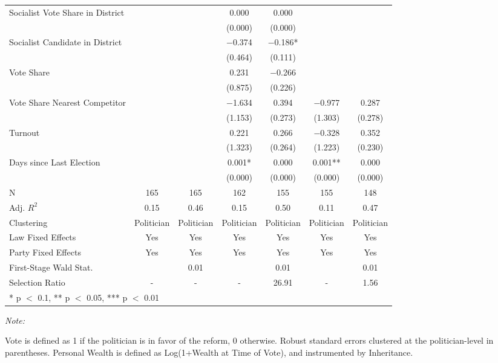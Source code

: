 \begin{table}[!h]
{\begin{threeparttable}
\begin{tabular}[t]{lcccccc}
Socialist Vote Share in District &  &  & \num{0.000} & \num{0.000} &  & \\
 &  &  & (\num{0.000}) & (\num{0.000}) &  & \\
Socialist Candidate in District &  &  & \num{-0.374} & \num{-0.186}* &  & \\
 &  &  & (\num{0.464}) & (\num{0.111}) &  & \\
Vote Share &  &  & \num{0.231} & \num{-0.266} &  & \\
 &  &  & (\num{0.875}) & (\num{0.226}) &  & \\
Vote Share Nearest Competitor &  &  & \num{-1.634} & \num{0.394} & \num{-0.977} & \num{0.287}\\
 &  &  & (\num{1.153}) & (\num{0.273}) & (\num{1.303}) & (\num{0.278})\\
Turnout &  &  & \num{0.221} & \num{0.266} & \num{-0.328} & \num{0.352}\\
 &  &  & (\num{1.323}) & (\num{0.264}) & (\num{1.223}) & (\num{0.230})\\
Days since Last Election &  &  & \num{0.001}* & \num{0.000} & \num{0.001}** & \num{0.000}\\
 &  &  & (\num{0.000}) & (\num{0.000}) & (\num{0.000}) & (\num{0.000})\\
\midrule
N & \num{165} & \num{165} & \num{162} & \num{155} & \num{155} & \num{148}\\
Adj. $R^2$ & \num{0.15} & \num{0.46} & \num{0.15} & \num{0.50} & \num{0.11} & \num{0.47}\\
Clustering & Politician & Politician & Politician & Politician & Politician & Politician\\
Law Fixed Effects & Yes & Yes & Yes & Yes & Yes & Yes\\
Party Fixed Effects & Yes & Yes & Yes & Yes & Yes & Yes\\
First-Stage Wald Stat. &  & 0.01 &  & 0.01 &  & 0.01\\
Selection Ratio & - & - & - & 26.91 & - & 1.56\\
\bottomrule
\multicolumn{7}{l}{\rule{0pt}{1em}* p $<$ 0.1, ** p $<$ 0.05, *** p $<$ 0.01}\\
\end{tabular}
\begin{tablenotes}[para]
\item \textit{Note: } 
\item Vote is defined as 1 if the politician is in favor of the reform, 0 otherwise. Robust standard errors clustered at the politician-level in parentheses. Personal Wealth is defined as Log(1+Wealth at Time of Vote), and instrumented by Inheritance.
\end{tablenotes}
\end{threeparttable}}
\end{table}
